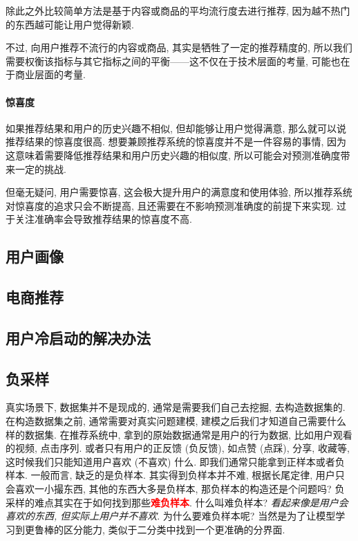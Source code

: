 除此之外比较简单方法是基于内容或商品的平均流行度去进行推荐, 因为越不热门的东西越可能让用户觉得新颖. 

不过, 向用户推荐不流行的内容或商品, 其实是牺牲了一定的推荐精度的, 所以我们需要权衡该指标与其它指标之间的平衡——这不仅在于技术层面的考量, 可能也在于商业层面的考量. 

\paragraph{惊喜度}如果推荐结果和用户的历史兴趣不相似, 但却能够让用户觉得满意, 那么就可以说推荐结果的惊喜度很高. 想要兼顾推荐系统的惊喜度并不是一件容易的事情, 因为这意味着需要降低推荐结果和用户历史兴趣的相似度, 所以可能会对预测准确度带来一定的挑战. 

但毫无疑问, 用户需要惊喜, 这会极大提升用户的满意度和使用体验, 所以推荐系统对惊喜度的追求只会不断提高, 且还需要在不影响预测准确度的前提下来实现. 过于关注准确率会导致推荐结果的惊喜度不高. 



\subsection{用户画像}

\subsection{电商推荐}

\subsection{用户冷启动的解决办法}

\subsection{负采样}
真实场景下, 数据集并不是现成的, 通常是需要我们自己去挖掘, 去构造数据集的. 在构造数据集之前, 通常需要对真实问题建模, 建模之后我们才知道自己需要什么样的数据集. 在推荐系统中, 拿到的原始数据通常是用户的行为数据, 比如用户观看的视频, 点击序列. 或者只有用户的正反馈 (负反馈), 如点赞 (点踩), 分享, 收藏等, 这时候我们只能知道用户喜欢 (不喜欢) 什么. 即我们通常只能拿到正样本或者负样本. 一般而言, 缺乏的是负样本. 其实得到负样本并不难, 根据长尾定律, 用户只会喜欢一小撮东西, 其他的东西大多是负样本, 那负样本的构造还是个问题吗? 负采样的难点其实在于如何找到那些\textcolor{red}{\textbf{难负样本}}. 什么叫难负样本? \textit{看起来像是用户会喜欢的东西, 但实际上用户并不喜欢}. 为什么要难负样本呢? 当然是为了让模型学习到更鲁棒的区分能力, 类似于二分类中找到一个更准确的分界面.

